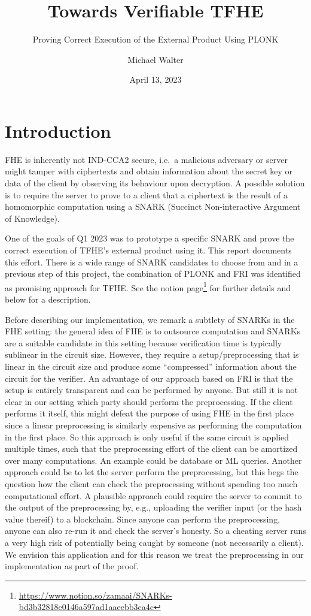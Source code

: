 \documentclass{zamarep}
\title{Towards Verifiable TFHE}
\subtitle{Proving Correct Execution of the External Product Using PLONK}
\author[MW]{Michael Walter}
\date{April 13, 2023}
\begin{document}
\maketitle


\section{Introduction}\label{sec:introduction}

FHE is inherently not IND-CCA2 secure, i.e.\ a malicious adversary or server might tamper with ciphertexts and obtain information about the secret key or data of the client by observing its behaviour upon decryption. A possible solution is to require the server to prove to a client that a ciphertext is the result of a homomorphic computation using a SNARK (Succinct Non-interactive Argument of Knowledge).

One of the goals of Q1 2023 was to prototype a specific SNARK and prove the correct execution of TFHE's external product using it. This report documents this effort. There is a wide range of SNARK candidates to choose from and in a previous step of this project, the combination of PLONK and FRI was identified as promising approach for TFHE. See the notion page\footnote{\url{https://www.notion.so/zamaai/SNARKs-bd3b32818e0146a597ad1aaeebb3ca4c}} for further details and below for a description.

Before describing our implementation, we remark a subtlety of SNARKs in the FHE setting: the general idea of FHE is to outsource computation and SNARKs are a suitable candidate in this setting because verification time is typically sublinear in the circuit size. However, they require a setup/preprocessing that is linear in the circuit size and produce some ``compressed'' information about the circuit for the verifier. An advantage of our approach based on FRI is that the setup is entirely transparent and can be performed by anyone. But still it is not clear in our setting which party should perform the preprocessing. If the client performs it itself, this might defeat the purpose of using FHE in the first place since a linear preprocessing is similarly expensive as performing the computation in the first place. So this approach is only useful if the same circuit is applied multiple times, such that the preprocessing effort of the client can be amortized over many computations. An example could be database or ML queries. Another approach could be to let the server perform the preprocessing, but this begs the question how the client can check the preprocessing without spending too much computational effort. A plausible approach could require the server to commit to the output of the preprocessing by, e.g., uploading the verifier input (or the hash value thereif) to a blockchain. Since anyone can perform the preprocessing, anyone can also re-run it and check the server's honesty. So a cheating server runs a very high risk of potentially being caught by someone (not necessarily a client). We envision this application and for this reason we treat the preprocessing in our implementation as part of the proof. 
\end{document}
